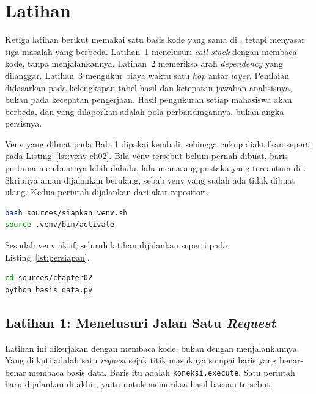 \section{Latihan}

Ketiga latihan berikut memakai satu basis kode yang sama di
, tetapi menyasar tiga masalah yang berbeda.
Latihan~1 menelusuri \textit{call stack} dengan membaca kode, tanpa
menjalankannya. Latihan~2 memeriksa arah \textit{dependency} yang dilanggar.
Latihan~3 mengukur biaya waktu satu \textit{hop} antar \textit{layer}. Penilaian didasarkan pada kelengkapan tabel hasil dan ketepatan
jawaban analisisnya, bukan pada kecepatan pengerjaan. Hasil pengukuran setiap
mahasiswa akan berbeda, dan yang dilaporkan adalah pola perbandingannya, bukan
angka persisnya.

Venv yang dibuat pada Bab~1 dipakai kembali, sehingga cukup diaktifkan seperti
pada Listing~\ref{lst:venv-ch02}. Bila venv tersebut belum pernah dibuat, baris
pertama membuatnya lebih dahulu, lalu memasang pustaka yang tercantum di
. Skripnya aman dijalankan berulang, sebab
venv yang sudah ada tidak dibuat ulang. Kedua perintah dijalankan dari akar
repositori.

\begin{lstlisting}[language=bash, caption={Mengaktifkan venv, skrip tersedia di
  \berkas{sources/siapkan_venv.sh}}, label=lst:venv-ch02]
bash sources/siapkan_venv.sh
source .venv/bin/activate
\end{lstlisting}

Sesudah venv aktif, seluruh latihan dijalankan seperti pada
Listing~\ref{lst:persiapan}.

\begin{lstlisting}[language=bash, caption={Persiapan sebelum ketiga latihan},
  label=lst:persiapan]
cd sources/chapter02
python basis_data.py
\end{lstlisting}

\subsection*{Latihan 1: Menelusuri Jalan Satu \textit{Request}}

Latihan ini dikerjakan dengan membaca kode, bukan dengan menjalankannya. Yang
diikuti adalah satu \textit{request} sejak titik masuknya sampai baris yang
benar-benar membaca basis data. Baris itu adalah \texttt{koneksi.execute}. Satu
perintah baru dijalankan di akhir, yaitu untuk memeriksa hasil bacaan tersebut.

